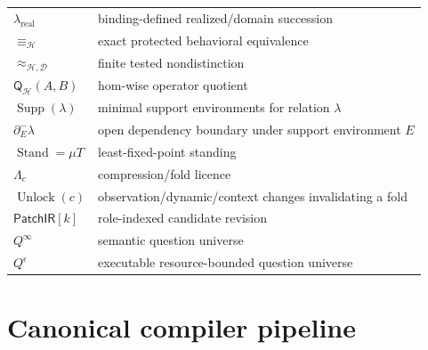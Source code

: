 \documentclass[11pt,oneside]{article}
\newcommand{\PatchIR}{\mathsf{PatchIR}}
\newcommand{\Stand}{\operatorname{Stand}}
\newcommand{\Supp}{\operatorname{Supp}}
\newcommand{\Unlock}{\operatorname{Unlock}}
\begin{document}
\begin{longtable}{p{}p{}}
\(\lambda_{\mathrm{real}}\) & binding-defined realized/domain succession\\
\(\equiv_{\mathcal H}\) & exact protected behavioral equivalence\\
\(\approx_{\mathcal H,\mathcal D}\) & finite tested nondistinction\\
\(\mathsf Q_{\mathcal H}(A,B)\) & hom-wise operator quotient\\
\(\Supp(\lambda)\) & minimal support environments for relation \(\lambda\)\\
\(\partial^-_E\lambda\) & open dependency boundary under support environment \(E\)\\
\(\Stand=\mu T\) & least-fixed-point standing\\
\(\Lambda_c\) & compression/fold licence\\
\(\Unlock(c)\) & observation/dynamic/context changes invalidating a fold\\
\(\PatchIR[k]\) & role-indexed candidate revision\\
\(Q^\infty\) & semantic question universe\\
\(Q^\epsilon\) & executable resource-bounded question universe\\
\bottomrule
\end{longtable}

\section{Canonical compiler pipeline}
\end{document}
